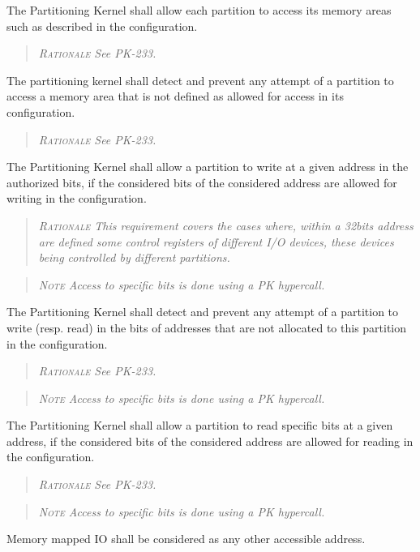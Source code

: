 The Partitioning Kernel shall allow each partition to access its memory areas such as described in the configuration.
\begin{quote}\it
\textsc{Rationale}
See PK-233.
\end{quote}

The partitioning kernel shall detect and prevent any attempt of a partition to access a memory area that is not defined as allowed for access in its configuration.
\begin{quote}\it
\textsc{Rationale}
See PK-233.
\end{quote}

The Partitioning Kernel shall allow a partition to write at a given address in the authorized bits, if the considered bits of the considered address are allowed for writing in the configuration.
\begin{quote}\it
\textsc{Rationale}
This requirement covers the cases where, within a 32bits address are defined some control registers of different I/O devices, these devices being controlled by different partitions.
\end{quote}
\begin{quote}\it
\textsc{Note}
Access to specific bits is done using a PK hypercall.
\end{quote}

The Partitioning Kernel shall detect and prevent any attempt of a partition to write (resp. read) in the bits of addresses that are not allocated to this partition in the configuration.
\begin{quote}\it
\textsc{Rationale}
See PK-233.
\end{quote}
\begin{quote}\it
\textsc{Note}
Access to specific bits is done using a PK hypercall.
\end{quote}

The Partitioning Kernel shall allow a partition to read specific bits at a given address, if the considered bits of the considered address are allowed for reading in the configuration.
\begin{quote}\it
\textsc{Rationale}
See PK-233.
\end{quote}
\begin{quote}\it
\textsc{Note}
Access to specific bits is done using a PK hypercall.
\end{quote}

Memory mapped IO shall be considered as any other accessible address.

